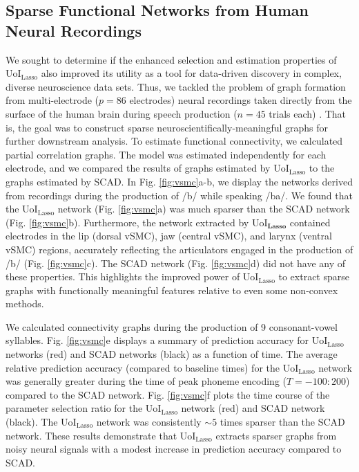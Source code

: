 \documentclass[letterpaper, 10 pt, conference]{ieeeconf}  %
\begin{document}
\subsection{Sparse Functional Networks from Human Neural Recordings}

We sought to determine if the enhanced selection and estimation properties of UoI$_{\text{Lasso}}$ also improved its utility as a tool for data-driven discovery in complex, diverse neuroscience data sets. Thus, we tackled the problem of graph formation from multi-electrode ($p=86$ electrodes) neural recordings taken directly from the surface of the human brain during speech production ($n=45$ trials each) \cite{bouchard2013}. That is, the goal was to construct sparse neuroscientifically-meaningful graphs for further downstream analysis. To estimate functional connectivity, we calculated partial correlation graphs. The model was estimated independently for each electrode, and we compared the results of graphs estimated by UoI$_{\text{Lasso}}$ to the graphs estimated by SCAD. In Fig. \ref{fig:vsmc}a-b, we display the networks derived from recordings during the production of /b/ while speaking /ba/. We found that the UoI$_{\text{Lasso}}$ network (Fig. \ref{fig:vsmc}a) was much sparser than the SCAD network (Fig. \ref{fig:vsmc}b). Furthermore, the network extracted by UoI$_{\textbf{Lasso}}$ contained electrodes in the lip (dorsal vSMC), jaw (central vSMC), and larynx (ventral vSMC) regions, accurately reflecting the articulators engaged in the production of /b/ (Fig. \ref{fig:vsmc}c). The SCAD network (Fig. \ref{fig:vsmc}d) did not have any of these properties. This highlights the improved power of UoI$_{\text{Lasso}}$ to extract sparse graphs with functionally meaningful features relative to even some non-convex methods.

We calculated connectivity graphs during the production of 9 consonant-vowel syllables. Fig. \ref{fig:vsmc}e displays a summary of prediction accuracy for UoI$_{\text{Lasso}}$ networks (red) and SCAD networks (black) as a function of time. The average relative prediction accuracy (compared to baseline times) for the UoI$_{\text{Lasso}}$ network was generally greater during the time of peak phoneme encoding ($T = -100:200$) compared to the SCAD network. Fig. \ref{fig:vsmc}f plots the time course of the parameter selection ratio for the UoI$_{\text{Lasso}}$ network (red) and SCAD network (black). The UoI$_{\text{Lasso}}$ network was consistently $\sim5$ times sparser than the SCAD network. These results demonstrate that UoI$_{\text{Lasso}}$ extracts sparser graphs from noisy neural signals with a modest increase in prediction accuracy compared to SCAD.
\end{document}
